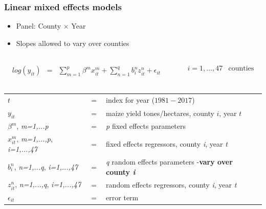 \documentclass{beamer}              %
\begin{document}
\begin{frame}
\frametitle{Linear mixed effects models}\label{Methods} 

\begin{itemize}
\item Panel: County $\times$ Year
\item Slopes allowed to vary over counties
\end{itemize}


\begin{columns}

\begin{column}{0.6\textwidth} 
\begingroup
\everymath{\Large}
\begin{align*}
\begin{array}{lcl}
 log(y_{\scriptscriptstyle it} )&=&\sum_{\scriptscriptstyle m=1}^{\scriptscriptstyle p} \beta^{\scriptscriptstyle m}x^{\scriptscriptstyle m}_{\scriptscriptstyle it}+ \sum_{\scriptscriptstyle n=1}^{\scriptscriptstyle q}b^{\scriptscriptstyle n}_{\scriptscriptstyle i}z^{\scriptscriptstyle n}_{\scriptscriptstyle it}+\epsilon_{\scriptscriptstyle it}
\end{array}
\end{align*}
\endgroup
\end{column}

\begin{column}{0.4\textwidth} 
\begingroup
\everymath{\footnotesize}
\begin{align*}
\begin{array}{ll}
i=1,...,47 & \text{counties}
\end{array}
\end{align*}
\endgroup
\end{column}
\end{columns}


\begin{table}
\begin{footnotesize}
\begin{tabular}{lll}

$t$&$=$&index for year ($1981-2017$) \\
$y_{\scriptscriptstyle it}$ &$=$&maize yield tones/hectares, county $i$, year $t$\\
${\beta}^{m}$, \footnotesize{\textit{m=1,...p}}&$=$&\textit{p} fixed effects parameters\\
$x^{m}_{it}$, \footnotesize{\textit{m=1,...,p}}, \footnotesize{\textit{i=1,...,47}} &$=$&fixed effects regressors, county \textit{i}, year \textit{t}\\
$b^{n}_i$, \footnotesize{\textit{n=1,...q}}, \footnotesize{\textit{i=1,...,47}}&$=$&\textit{q} random effects parameters -\textbf{vary over county \textit{i}}\\
$z^{n}_{it}$, \footnotesize{\textit{n=1,...,q}}, \footnotesize{\textit{i=1,...,47}} &$=$&random effects regressors, county \textit{i}, year \textit{t}\\
$\epsilon_{it}$ &$=$&error term \\
\end{tabular}
\end{footnotesize}
\end{table}

\end{frame}
\end{document}
